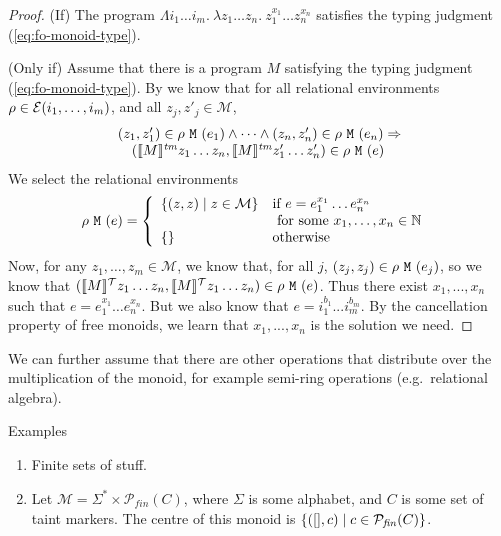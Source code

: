 \begin{proof}
  (If) The program $\Lambda i_1\dots i_m.\ \lambda z_1\dots z_n.\
  z_1^{x_1}\dots z_n^{x_n}$ satisfies the typing judgment
  (\ref{eq:fo-monoid-type}).

  (Only if) Assume that there is a program $M$ satisfying the typing
  judgment (\ref{eq:fo-monoid-type}). By \thmref{thm:abstraction} we
  know that for all relational environments $\rho \in
  \mathcal{E}(i_1,\dots,i_m)$, and all $z_j,z'_j \in \mathcal{M}$,
  \begin{displaymath}
    \begin{array}{l}
      (z_1,z'_1) \in \rho\ \tyPrimNm{M}\ (e_1) \land \dots \land (z_n,z'_n) \in \rho\ \tyPrimNm{M}\ (e_n) \Rightarrow \\
      \quad (\tmSem{M}z_1\dots z_n, \tmSem{M}z'_1\dots z'_n) \in \rho\ \tyPrimNm{M}\ (e)
    \end{array}
  \end{displaymath}
  We select the relational environments
  \begin{displaymath}
    \rho\ \tyPrimNm{M}\ (e) = \left\{
      \begin{array}{ll}
        \{(z,z) \sepbar z \in \mathcal{M} \} &
        \begin{array}[t]{@{}l}
          \textrm{if}\ e = e_1^{x_1}\dots e_n^{x_n} \\
          \textrm{ for some }x_1,\dots,x_n \in \mathbb{N}
        \end{array}
        \\
        \{\} & \textrm{otherwise}
      \end{array}
    \right.
  \end{displaymath}
  Now, for any $z_1,\dots,z_m \in \mathcal{M}$, we know that, for all
  $j$, $(z_j,z_j) \in \rho\ \tyPrimNm{M}\ (e_j)$, so we know that
  $(\llbracket M \rrbracket^{\mathcal{T}}z_1\dots z_n, \llbracket M \rrbracket^{\mathcal{T}}z_1 \dots z_n) \in \rho\
  \texttt{M}\ (e)$. Thus there exist $x_1,...,x_n$ such that $e =
  e_1^{x_1}\dots e_n^{x_n}$. But we also know that $e =
  i_1^{b_1}...i_m^{b_m}$. By the cancellation property of free
  monoids, we learn that $x_1,...,x_n$ is the solution we need.
\end{proof}

We can further assume that there are other operations that distribute
over the multiplication of the monoid, for example semi-ring
operations (e.g.~relational algebra).

Examples
\begin{enumerate}
\item Finite sets of stuff.
\item Let $\mathcal{M} = \Sigma^* \times
  \mathcal{P}_{\mathit{fin}}(C)$, where $\Sigma$ is some alphabet, and
  $C$ is some set of taint markers. The centre of this monoid is
  $\{([], c) \mathrel| c \in \mathcal{P}_{\mathit{fin}}(C) \}$.
\end{enumerate}

